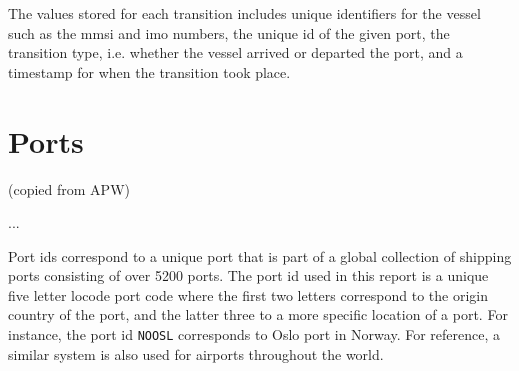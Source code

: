 The values stored for each transition includes unique identifiers for the vessel such as the \acrfull{mmsi} and \acrfull{imo} numbers, the unique id of the given port, the transition type, i.e. whether the vessel arrived or departed the port, and a timestamp for when the transition took place. 

\section{Ports}
\label{sec:port_data}

(copied from APW)

...

Port ids correspond to a unique port that is part of a global collection of shipping ports consisting of over 5200 ports. The port id used in this report is a unique five letter \Gls{locode} port code where the first two letters correspond to the origin country of the port, and the latter three to a more specific location of a port. For instance, the port id \texttt{NOOSL} corresponds to Oslo port in Norway. For reference, a similar system is also used for airports throughout the world.